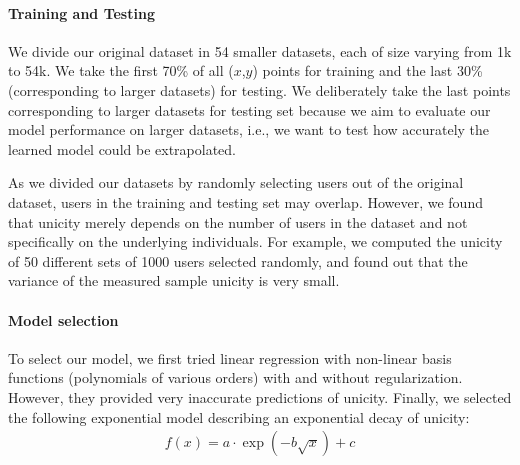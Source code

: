 \documentclass{acm_proc_article-sp}
\theoremstyle{plain}
\theoremstyle{plain}
\theoremstyle{plain}
\theoremstyle{plain}
\theoremstyle{plain}
\theoremstyle{plain}
\begin{document}
\paragraph{Training and Testing}
We divide our original dataset in 54 smaller datasets, each of size varying from 1k to 54k.
We take the first 70\%  of all ($x$,$y$) points for training and the last 30\%  (corresponding to larger datasets) for testing.
We deliberately take the last points corresponding to larger datasets for testing set because we aim to evaluate our model performance on larger datasets, i.e., we want to test how accurately the learned model could be extrapolated.


As we divided our datasets by randomly selecting users out of the original dataset, users in the training and testing set may overlap.
However, we found that unicity merely depends on the number of users in the dataset and not specifically on the underlying individuals.
For example, we computed the unicity of 50 different sets of 1000 users selected randomly, and found out that the variance of the measured sample unicity is very small.







\paragraph{Model selection}

To select our model, we first tried linear regression with non-linear basis functions (polynomials of various orders) with and without regularization.
However, they provided very inaccurate predictions of unicity. Finally, we selected the following exponential model describing an exponential decay of unicity:
\begin{align}
\label{eq:model}
f(x) = a\cdot \exp(-b\sqrt{x}) + c
\end{align}
\end{document}
